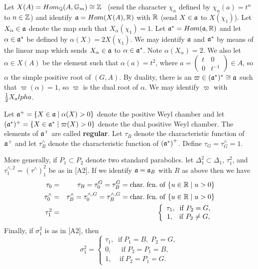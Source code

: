 \documentclass[amsfonts,12pt]{article}
\def\qqq{\mathbb{Q}}
\begin{document}
Let $X(A)=Hom_{\qqq}(A,{\Bbb{G}}_m)\cong {\Bbb{Z}}$ \
(send the character $\chi _n$ defined by $\chi _n(a)=t^n$
to $n\in {\Bbb{Z}}$) and identify ${{\frak{a}}}=Hom(X(A),\Bbb{R})$
with $\Bbb{R}$ (send $X\in {\frak{a}}$ to $X(\chi _1)$).
Let $X_\alpha\in {\frak{a}}$ denote the map such that
$X_\alpha (\chi_1)=1$.
Let ${\frak{a}}^{*}=Hom({\frak{a}},\Bbb{R})$ and let $\alpha \in {\frak{a}}^{*}$
be defined by $\alpha (X)=2X(\chi _1)$.
We may identify ${\frak{a}}$ and ${\frak{a}}^*$ by means of the
linear map which sends
$X_\alpha\in {\frak{a}}$ to $\alpha\in {\frak{a}}^*$.
Note $\alpha(X_\alpha )=2$.
We also let $\alpha \in X(A)$ be the
element such that $\alpha (a)=t^2$, where $a=\left( 
\begin{array}{cc}
t & 0 \\ 
0 & t^{-1}
\end{array}
\right) \in A$, so $\alpha $ the simple positive root of $(G,A)$. By
duality, there is an $\varpi \in ({\frak{a}}^{*})^{*}\cong {\frak{a}}$
such that 
$\varpi (\alpha )=1$, so $\varpi $ is the dual root of $\alpha $. We
may identify $\varpi$ with ${1\over 2}X_alpha$.

Let ${\frak{a}}^{+}=\{X\in {\frak{a}}\;|\;\alpha (X)>0\}$
denote the positive
Weyl chamber and let
$({\frak{a}}^{*})^{+}=\{X\in {\frak{a}}^{*}\;|\;\varpi (X)>0\}$
denote the dual positive Weyl chamber. The elements of
${\frak{a}}^{+} $ are called {\bf regular}. Let $\tau _B$ denote
the characteristic
function of ${\frak{a}}^{+}$ and let $\tau _B^{\wedge }$ denote the
characteristic function of $({\frak{a}}^{*}\frak{)}^{+}$.
Define $\tau _G=\tau _G^{\wedge }=1$.

More generally, if $P_1\subset P_2$ denote two standard
parabolics. let $\Delta _1^2\subset \Delta _1$, $\tau _1^2$,
and $\tau _1^{\wedge ,2}=(\tau^{\wedge })_1^2$ be as in [A2].
If we identify ${\frak{a}}={\frak{a}}_B$ with $R$
as above then we have 
\begin{eqnarray}
\tau _0 &=&\tau _B=\tau _0^G=\tau _B^G=\mathrm{char.\;fcn.\;of}
\;\{u\in {\Bbb{R}}\;|\;u>0\} \\
\tau _0^{\wedge }
&=&\tau _B^{\wedge }=\tau _0^{\wedge ,G}
=\tau _B^{\wedge,G}=\mathrm{char.\;fcn.\;of}
\;\{u\in {\Bbb{R}}\;|\;u>0\}  \nonumber \\
\tau _1^2 &=&\left\{ 
\begin{array}{c}
\tau _1,\;\;\mathrm{if}\;P_2=G, \\ 
1,\;\;\;\mathrm{if}\;P_2\neq G,
\end{array}
\right.  \nonumber
\end{eqnarray}
Finally, if $\sigma _1^2$ is as in [A2], then 
\begin{equation}
\sigma _1^2=\left\{ 
\begin{array}{c}
\tau _1,\;\;\mathrm{if}\;P_1=B,\;P_2=G, \\ 
0,\;\;\;\;\;\mathrm{if}\;P_2=P_1=B, \\ 
1,\;\;\;\;\mathrm{if}\;P_2=P_1=G.
\end{array}
\right.
\end{equation}
\end{document}
